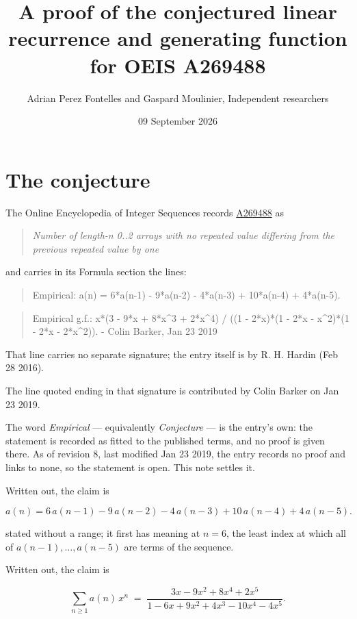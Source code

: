 \documentclass[11pt]{article}
\title{A proof of the conjectured linear recurrence and generating function for OEIS A269488}
\author{Adrian Perez Fontelles and Gaspard Moulinier, Independent researchers}
\date{09 September 2026}
\theoremstyle{definition}
\begin{document}
\maketitle
\section{The conjecture}

The Online Encyclopedia of Integer Sequences records \href{https://oeis.org/A269488}{A269488} as

\begin{quote}\itshape Number of length-n 0..2 arrays with no repeated value differing from the previous repeated value by one\end{quote}

and carries in its Formula section the lines:

\begin{quote}\ttfamily Empirical: a(n) = 6*a(n-1) - 9*a(n-2) - 4*a(n-3) + 10*a(n-4) + 4*a(n-5).\end{quote}

\begin{quote}\ttfamily Empirical g.f.: x*(3 - 9*x + 8*x\textasciicircum{}3 + 2*x\textasciicircum{}4) / ((1 - 2*x)*(1 - 2*x - x\textasciicircum{}2)*(1 - 2*x - 2*x\textasciicircum{}2)). - Colin Barker, Jan 23 2019\end{quote}

That line carries no separate signature; the entry itself is by R. H. Hardin (Feb 28 2016).

The line quoted ending in that signature is contributed by Colin Barker on Jan 23 2019.

The word {\itshape Empirical} --- equivalently {\itshape Conjecture} --- is the entry's own: the statement is recorded as fitted to the published terms, and no proof is given there. As of revision 8, last modified Jan 23 2019, the entry records no proof and links to none, so the statement is open. This note settles it.

Written out, the claim is

\[a(n) = 6\,a(n-1) - 9\,a(n-2) - 4\,a(n-3) + 10\,a(n-4) + 4\,a(n-5).\]

stated without a range; it first has meaning at $n = 6$, the least index at which all of $a(n-1),\dots,a(n-5)$ are terms of the sequence.

Written out, the claim is

\[\sum_{n \ge 1} a(n)\,x^n \;=\; \frac{3x - 9x^{2} + 8x^{4} + 2x^{5}}{1 - 6x + 9x^{2} + 4x^{3} - 10x^{4} - 4x^{5}}.\]
\end{document}
